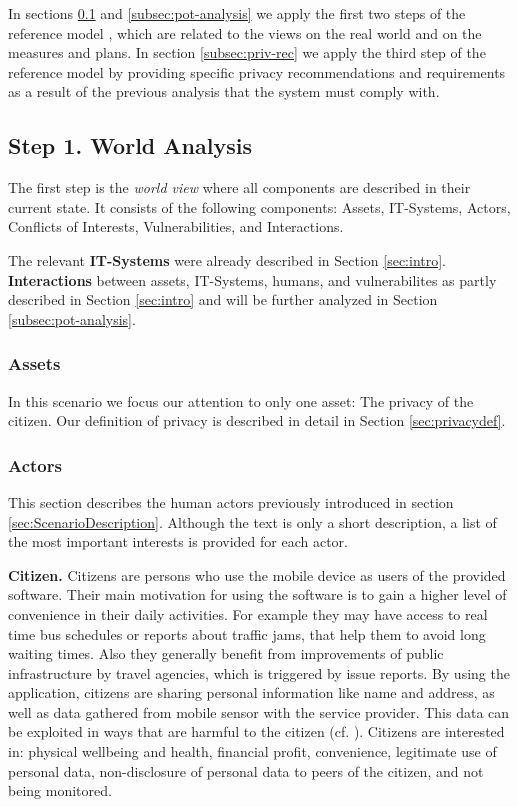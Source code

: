 \documentclass[runningheads,a4paper]{llncs}
\begin{document}
In sections \ref{subsec:world-analysis} and \ref{subsec:pot-analysis} we apply the first two steps of the reference model \cite{Grimm:ItSecRefModel}, which are related to the views on the real world and on the measures and plans. In section \ref{subsec:priv-rec} we apply the third step of the reference model by providing specific privacy recommendations and requirements as a result of the previous analysis that the system must comply with. 


\subsection{Step 1. World Analysis}

\label{subsec:world-analysis}

The first step is the \emph{world view} where all components are described in their current state. It consists of the following components: Assets, IT-Systems, Actors, Conflicts of Interests, Vulnerabilities, and Interactions.

The relevant \textbf{IT-Systems} were already described in Section \ref{sec:intro}.
\textbf{Interactions} between assets, IT-Systems, humans, and vulnerabilites as partly described in Section \ref{sec:intro} and will be further analyzed in Section \ref{subsec:pot-analysis}.
	

\subsubsection{Assets}

In this scenario we focus our attention to only one asset: The privacy of the citizen. Our definition of privacy is described in detail in Section \ref{sec:privacydef}.

\subsubsection{Actors}
\label{subsubsection:humans}

This section describes the human actors previously introduced in section \ref{sec:ScenarioDescription}. Although the text is only a short description, a list of the most important interests is provided for each actor.

\textbf{Citizen.}
Citizens are persons who use the mobile device as users of the provided software.
Their main motivation for using the software is to gain a higher level of convenience in their daily activities. For example they may have access to real time bus schedules or reports about traffic jams, that help them to avoid long waiting times. Also they generally benefit from improvements of public infrastructure by travel agencies, which is triggered by issue reports. By using the application, citizens are sharing personal information like name and address, as well as data gathered from mobile sensor with the service provider. This data can be exploited in ways that are harmful to the citizen (cf. \cite{GuardienMassSurveillance}). Citizens are interested in: physical wellbeing and health, financial profit, convenience, legitimate use of personal data, non-disclosure of personal data to peers of the citizen, and not being monitored.
\end{document}
